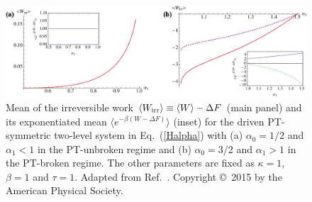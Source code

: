 \documentclass{tADP2e}
\theoremstyle{plain}
\theoremstyle{plain}
\theoremstyle{definition}
\begin{document}
\begin{figure}[!t]
\begin{center}
\includegraphics[width=14cm]{./Figures/fig_6_QWD.pdf}
\end{center}
\caption{Mean of the irreversible work $\langle W_{\rm irr}\rangle\equiv\langle W\rangle-\Delta F$ (main panel) and its exponentiated mean $\langle e^{-\beta (W-\Delta F)}\rangle$ (inset) for the driven PT-symmetric two-level system in Eq.~(\ref{Halpha}) with (a) $\alpha_0=1/2$ and $\alpha_1<1$ in the PT-unbroken regime and (b) $\alpha_0=3/2$ and $\alpha_1>1$ in the PT-broken regime. The other parameters are fixed as $\kappa=1$, $\beta=1$ and $\tau=1$.  Adapted from Ref.~\cite{DSSA15}. Copyright \copyright\,  2015 by the American Physical Society.}
\label{fig:QWD}
\end{figure}
\end{document}
